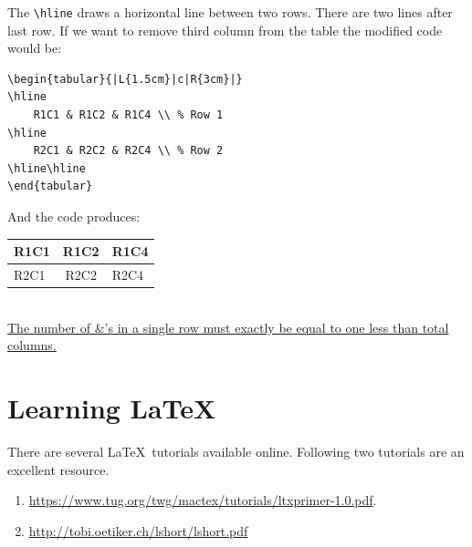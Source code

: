 \documentclass[12pt,a4paper]{article}
\begin{document}
The \verb|\hline| draws a horizontal line between two rows. There are two lines after last row. If we want to remove third column from the table the modified code would be:
\begin{lstlisting}
\begin{tabular}{|L{1.5cm}|c|R{3cm}|}
\hline
	R1C1 & R1C2 & R1C4 \\ % Row 1
\hline
	R2C1 & R2C2 & R2C4 \\ % Row 2
\hline\hline
\end{tabular}
\end{lstlisting}
And the code produces:
\begin{tabular}{|L{1.5cm}|c|R{3cm}|}
\hline
	R1C1 & R1C2 & R1C4 \\
\hline
	R2C1 & R2C2 & R2C4 \\
\hline\hline
\end{tabular}\\
\underline{The number of \&'s in a single row must exactly be equal to one less than total columns.}
\section{Learning \LaTeX}
There are several \LaTeX~tutorials available online. Following two tutorials are an excellent resource.
\begin{enumerate}
\item \url{https://www.tug.org/twg/mactex/tutorials/ltxprimer-1.0.pdf}.
\item \url{http://tobi.oetiker.ch/lshort/lshort.pdf}
\end{enumerate}
%
%
\end{document}
